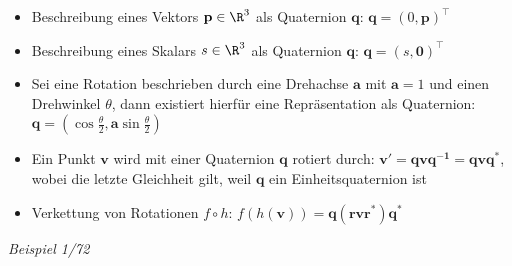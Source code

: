 \begin{itemize}
	\item Beschreibung eines Vektors $\mathbf{p}\in\R^3$ als Quaternion $\mathbf{q}$: $\mathbf{q}=(0,\mathbf{p})^\top$
	\item Beschreibung eines Skalars $s\in\R^3$ als Quaternion $\mathbf{q}$: $\mathbf{q}=(s,\mathbf{0})^\top$
	\item Sei eine Rotation beschrieben durch eine Drehachse $\mathbf{a}$ mit $\mathbf{a}=1$ und einen Drehwinkel $\theta$, dann existiert hierfür eine Repräsentation als Quaternion: $\mathbf{q}=\left(\cos\frac{\theta}{2},\mathbf{a}\sin\frac{\theta}{2}\right)$
	\item Ein Punkt $\mathbf{v}$ wird mit einer Quaternion $\mathbf{q}$ rotiert durch:
	$\mathbf{v'}=\mathbf{qvq^{-1}}=\mathbf{qvq^{*}}$, wobei die letzte Gleichheit gilt, weil $\mathbf{q}$ ein Einheitsquaternion ist
	\item Verkettung von Rotationen $f\circ h$: $f(h(\mathbf{v}))=\mathbf{q}(\mathbf{rvr^*})\mathbf{q^*}$
\end{itemize}

\textit{Beispiel 1/72}\\

